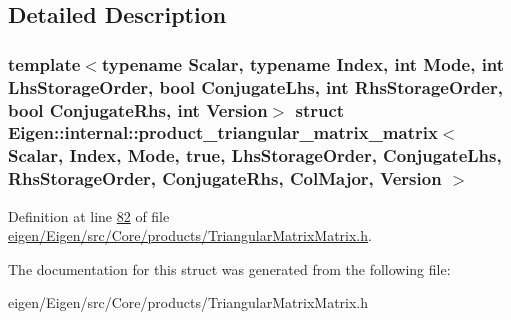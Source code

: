 \subsection{Detailed Description}
\subsubsection*{template$<$typename Scalar, typename Index, int Mode, int Lhs\+Storage\+Order, bool Conjugate\+Lhs, int Rhs\+Storage\+Order, bool Conjugate\+Rhs, int Version$>$\newline
struct Eigen\+::internal\+::product\+\_\+triangular\+\_\+matrix\+\_\+matrix$<$ Scalar, Index, Mode, true, Lhs\+Storage\+Order, Conjugate\+Lhs, Rhs\+Storage\+Order, Conjugate\+Rhs, Col\+Major, Version $>$}



Definition at line \hyperlink{eigen_2_eigen_2src_2_core_2products_2_triangular_matrix_matrix_8h_source_l00082}{82} of file \hyperlink{eigen_2_eigen_2src_2_core_2products_2_triangular_matrix_matrix_8h_source}{eigen/\+Eigen/src/\+Core/products/\+Triangular\+Matrix\+Matrix.\+h}.



The documentation for this struct was generated from the following file\+:\begin{DoxyCompactItemize}
\item 
eigen/\+Eigen/src/\+Core/products/\+Triangular\+Matrix\+Matrix.\+h\end{DoxyCompactItemize}
